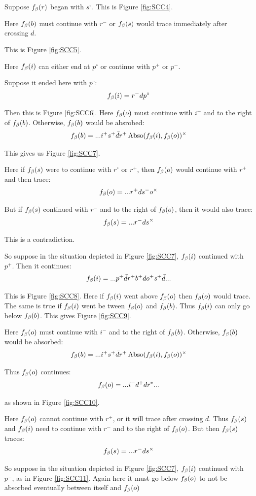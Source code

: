 Suppose $f_\beta(r)$ began with $s^\circ$. This is Figure \ref{fig:SCC4}.

Here $f_\beta(b)$ must continue with $r^-$ or $f_\beta(s)$ would trace immediately after crossing $d$. 

This is Figure \ref{fig:SCC5}.

Here $f_\beta(i)$ can either end at $p^\circ$ or continue with $p^+$ or $p^-$.

Suppose it ended here with $p^\circ$:
\[
f_\beta(i) = r^- d p^\circ
\]

Then this is Figure \ref{fig:SCC6}. Here $f_\beta(o)$ must continue with $i^-$ and to the right of $f_\beta(b)$. Otherwise, $f_\beta(b)$ would be absrobed:
\[
f_\beta(b) = ... i^+ s^+ \bar{d} r^+ \operatorname{Abso}(f_\beta(i), f_\beta(o))^\times
\]

This gives us Figure \ref{fig:SCC7}. 

Here if $f_\beta(s)$ were to continue with $r^\circ$ or $r^+$, then $f_\beta(o)$ would continue with $r^+$ and then trace:
\[
f_\beta(o) = ...r^+ d s^- o^\times
\]

But if $f_\beta(s)$ continued with $r^-$ and to the right of $f_\beta(o)$, then it would also trace:
\[
f_\beta(s) = ...r^- d s^\times
\]

This is a contradiction.

So suppose in the situation depicted in Figure \ref{fig:SCC7}, $f_\beta(i)$ continued with $p^+$. Then it continues:
\[
f_\beta(i) = ...p^+ \bar{d} r^+ b^+ d o^+ s^+ \bar{d}...
\]

This is Figure \ref{fig:SCC8}. Here if $f_\beta(i)$ went above $f_\beta(o)$ then $f_\beta(o)$ would trace. The same is true if $f_\beta(i)$ went be tween $f_\beta(o)$ and $f_\beta(b)$. Thus $f_\beta(i)$ can only go below $f_\beta(b)$. This gives Figure \ref{fig:SCC9}.

Here $f_\beta(o)$ must continue with $i^-$ and to the right of $f_\beta(b)$. Otherwise, $f_\beta(b)$ would be absorbed:
\[
f_\beta(b) = ...i^+ s^+ \bar{d} r^+ \operatorname{Abso}(f_\beta(i), f_\beta(o))^\times
\]

Thus $f_\beta(o)$ continues:
\[
f_\beta(o) = ...i^- d^+ \bar{d} r^*...
\]

as shown in Figure \ref{fig:SCC10}.

Here $f_\beta(o)$ cannot continue with $r^+$, or it will trace after crossing $d$. Thus $f_\beta(s)$ and $f_\beta(i)$ need to continue with $r^-$ and to the right of $f_\beta(o)$. But then $f_\beta(s)$ traces:
\[
f_\beta(s) = ...r^- d s^\times
\]

So suppose in the situation depicted in Figure \ref{fig:SCC7}, $f_\beta(i)$ continued with $p^-$, as in Figure \ref{fig:SCC11}. Again here it must go below $f_\beta(o)$ to not be absorbed eventually between itself and $f_\beta(o)$

